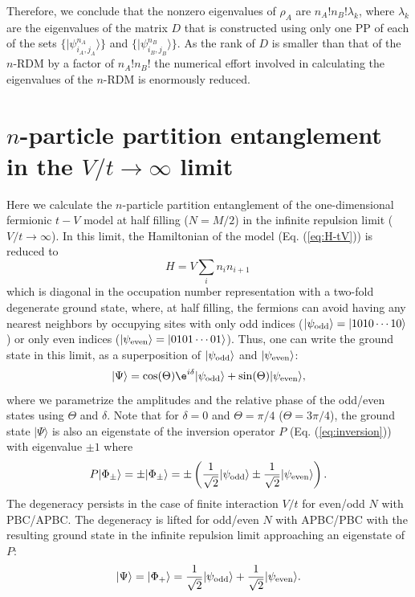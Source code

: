 Therefore, we conclude that the nonzero eigenvalues of $\rho_A$ are
$n_A!n_B!\lambda_k$, where $\lambda_k$ are the eigenvalues of the matrix $D$
that is constructed using only one PP of each of the sets $\{\vert
\psi^{n_A}_{i_A,j_A}\rangle\}$ and $\{\vert \psi^{n_B}_{i_B,j_B}\rangle\}$.
As the rank of $D$ is smaller than that of the $n$-RDM by a factor of
$n_A!n_B!$ the numerical effort involved in calculating the
eigenvalues of the $n$-RDM is enormously reduced.
\section{$n$-particle partition entanglement in the $V/t \to \infty$ limit} 
\label{appendixB}

Here we calculate the $n$-particle partition entanglement of the
one-dimensional fermionic $t-V$ model at half filling ($N=M/2$) in the infinite
repulsion limit ($V/t \rightarrow \infty$). In this limit, the Hamiltonian of
the model (Eq. (\ref{eq:H-tV})) is reduced to
%
\begin{equation}
  H= V\sum_i n_i n_{i+1}\,
  \label{eq:H-tV_infty}
\end{equation}
%
which is diagonal in the occupation number representation with a two-fold
degenerate ground state, where, at half filling, the fermions can avoid having
any nearest neighbors by occupying sites with only odd indices
($\vert\psi_{\rm{odd}}\rangle=\vert1010\cdots10\rangle$) or only even indices
($\vert\psi_{\rm{even}}\rangle=\vert0101\cdots01\rangle$). Thus, one can write the
ground state in this limit, as a superposition of
$\vert\psi_{\rm{odd}}\rangle$ and $\vert\psi_{\rm{even}}\rangle$:
%
\begin{equation}
\vert\Psi\rangle= \cos(\Theta)\e^{i\delta}\vert\psi_{\rm{odd}}\rangle+\sin(\Theta)\vert\psi_{\rm{even}}\rangle,
  \label{eq:gs_infty_deg}
\end{equation}
%
where we parametrize the amplitudes and the relative phase of the odd/even 
states using $\Theta$ and $\delta$. Note that for $\delta=0$ and
$\Theta=\pi/4$ ($\Theta=3\pi/4$), the ground state $\vert\Psi\rangle$ is also
an eigenstate of the inversion operator $P$ (Eq. (\ref{eq:inversion})) with
eigenvalue $\pm 1$ where
%
\begin{equation}
P\vert\Phi_{\pm}\rangle=\pm\vert\Phi_{\pm}\rangle =\pm\left(\frac{1}{\sqrt{2}}\vert\psi_{\rm{odd}}\rangle\pm\frac{1}{\sqrt{2}}\vert\psi_{\rm{even}}\rangle\right).
\end{equation}
%
The degeneracy persists in the case of finite interaction $V/t$  for even/odd
$N$ with PBC/APBC. The degeneracy is lifted for odd/even $N$ with APBC/PBC
with the resulting ground state in the infinite repulsion limit approaching
an eigenstate of $P$:
%
\begin{equation}
\vert\Psi\rangle=\vert\Phi_+\rangle= \frac{1}{\sqrt{2}}\vert\psi_{\rm{odd}}\rangle+\frac{1}{\sqrt{2}}\vert\psi_{\rm{even}}\rangle.
  \label{eq:gs_infty_NONdeg}
\end{equation}


